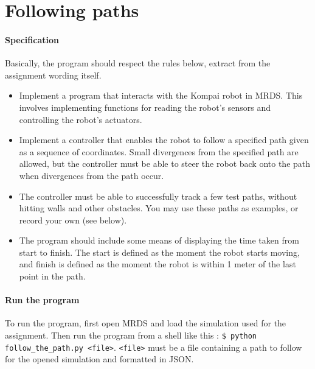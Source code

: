 
\section{Following paths}

\paragraph{Specification}{
    Basically, the program should respect the rules below, extract from the assignment wording itself.
    \begin{itemize}
        \item Implement a program that interacts with the Kompai robot in MRDS.
        This involves implementing functions for reading the robot's sensors
        and controlling the robot's actuators.
        
        \item Implement a controller that enables the robot to follow a
        specified path given as a sequence of coordinates. Small divergences
        from the specified path are allowed, but the controller must be able to
        steer the robot back onto the path when divergences from the path occur.
        
        \item The controller must be able to successfully track a few test
        paths, without hitting walls and other obstacles. You may use these
        paths as examples, or record your own (see below).
        
        \item The program should include some means of displaying the time
        taken from start to finish. The start is defined as the moment the
        robot starts moving, and finish is defined as the moment the robot is
        within 1 meter of the last point in the path.
    \end{itemize}

}


\paragraph{Run the program}{
    To run the program, first open MRDS and load the simulation used for the
 assignment. Then run the program from a shell like this : \texttt{\$ python
 follow\_the\_path.py <file>}. \texttt{<file>} must be a file containing a path
 to follow for the opened simulation and formatted in JSON.
}

